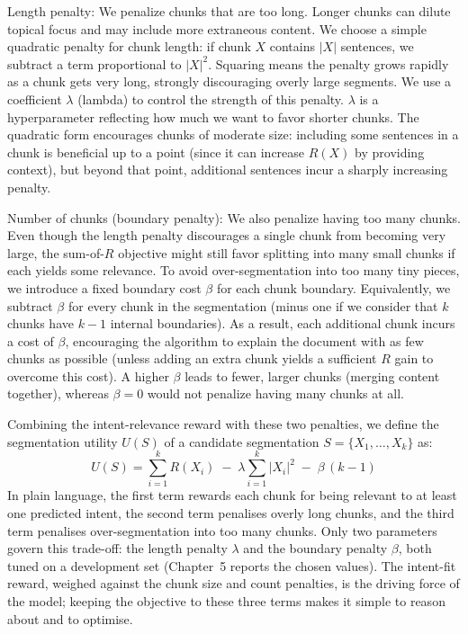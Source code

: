 \documentclass[12pt,a4paper]{report}
\begin{document}
Length penalty: We penalize chunks that are too long. Longer chunks can dilute topical focus and may include more extraneous content. We choose a simple quadratic penalty for chunk length: if chunk $X$ contains $|X|$ sentences, we subtract a term proportional to $|X|^2$. Squaring means the penalty grows rapidly as a chunk gets very long, strongly discouraging overly large segments. We use a coefficient $\lambda$ (lambda) to control the strength of this penalty. $\lambda$ is a hyperparameter reflecting how much we want to favor shorter chunks. The quadratic form encourages chunks of moderate size: including some sentences in a chunk is beneficial up to a point (since it can increase $R(X)$ by providing context), but beyond that point, additional sentences incur a sharply increasing penalty.

Number of chunks (boundary penalty): We also penalize having too many chunks. Even though the length penalty discourages a single chunk from becoming very large, the sum-of-$R$ objective might still favor splitting into many small chunks if each yields some relevance. To avoid over-segmentation into too many tiny pieces, we introduce a fixed boundary cost $\beta$ for each chunk boundary. Equivalently, we subtract $\beta$ for every chunk in the segmentation (minus one if we consider that $k$ chunks have $k-1$ internal boundaries). As a result, each additional chunk incurs a cost of $\beta$, encouraging the algorithm to explain the document with as few chunks as possible (unless adding an extra chunk yields a sufficient $R$ gain to overcome this cost). A higher $\beta$ leads to fewer, larger chunks (merging content together), whereas $\beta=0$ would not penalize having many chunks at all.

Combining the intent-relevance reward with these two penalties, we define the segmentation utility $U(S)$ of a candidate segmentation $S = \{X_1, \dots, X_k\}$ as:
\[
U(S) = \sum_{i=1}^k R(X_i) \;-\; \lambda \sum_{i=1}^k |X_i|^2 \;-\; \beta\,(k-1)
\]
In plain language, the first term rewards each chunk for being relevant to at least one predicted intent, the second term penalises overly long chunks, and the third term penalises over-segmentation into too many chunks. Only two parameters govern this trade-off: the length penalty $\lambda$ and the boundary penalty $\beta$, both tuned on a development set (Chapter~5 reports the chosen values). The intent-fit reward, weighed against the chunk size and count penalties, is the driving force of the model; keeping the objective to these three terms makes it simple to reason about and to optimise.
\end{document}
